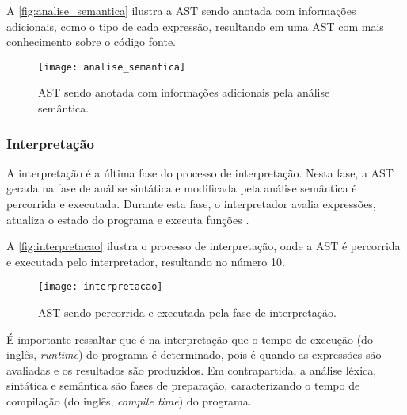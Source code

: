 A \autoref{fig:analise_semantica} ilustra a AST sendo anotada com informações adicionais, como o tipo de cada expressão, resultando em uma AST com mais conhecimento sobre o código fonte.

\begin{figure}[H]
	\centering
	\texttt{[image: analise\_semantica]}
	\caption{AST sendo anotada com informações adicionais pela análise semântica.}
	\label{fig:analise_semantica}
\end{figure}

\subsubsection{Interpretação}

A interpretação é a última fase do processo de interpretação. Nesta fase, a AST gerada na fase de análise sintática e modificada pela análise semântica é percorrida e executada. Durante esta fase, o interpretador avalia expressões, atualiza o estado do programa e executa funções \cite{craftinginterpreters}.

A \autoref{fig:interpretacao} ilustra o processo de interpretação, onde a AST é percorrida e executada pelo interpretador, resultando no número 10.

\begin{figure}[H]
	\centering
	\texttt{[image: interpretacao]}
	\caption{AST sendo percorrida e executada pela fase de interpretação.}
	\label{fig:interpretacao}
\end{figure}

É importante ressaltar que é na interpretação que o tempo de execução (do inglês, \textit{runtime}) do programa é determinado, pois é quando as expressões são avaliadas e os resultados são produzidos. Em contrapartida, a análise léxica, sintática e semântica são fases de preparação, caracterizando o tempo de compilação (do inglês, \textit{compile time}) do programa.
